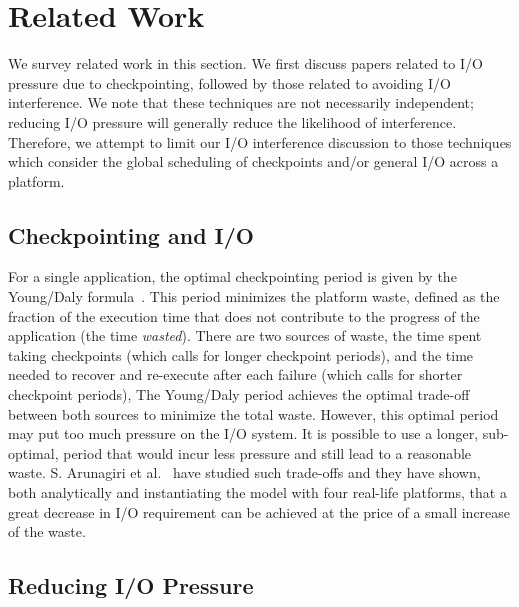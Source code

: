 

\section{Related Work}\label{sec:related}

We survey related work in this section. We first discuss papers related to I/O
pressure due to checkpointing, followed by those related to avoiding I/O
interference.  We note that these techniques are not necessarily independent;
reducing I/O pressure will generally reduce the likelihood of interference.
Therefore, we attempt to limit our I/O interference discussion to those
techniques which consider the global scheduling of checkpoints and/or general
I/O across a platform.


\subsection{Checkpointing and I/O}

For a single application, the optimal checkpointing period is given by the
Young/Daly formula~\cite{young74,daly04}. This period minimizes the platform
waste, defined as the fraction of the execution time that does not contribute
to the progress of the application (the time \emph{wasted}).  There are two
sources of waste, the time spent taking checkpoints (which calls for longer
checkpoint periods), and the time needed to recover and re-execute after each
failure (which calls for shorter checkpoint periods), The Young/Daly period
achieves the optimal trade-off between both sources to minimize the total
waste.  However, this optimal period may put too much pressure on the I/O
system. It is possible to use a longer, sub-optimal, period that would incur
less pressure and still lead to a reasonable waste. S. Arunagiri et
al.~\cite{Arunagiri2010} have studied such trade-offs and they have shown, both
analytically and instantiating the model with four real-life platforms, that a
great decrease in I/O requirement can be achieved  at the price of a small
increase of the waste.

\subsection{Reducing I/O Pressure}

